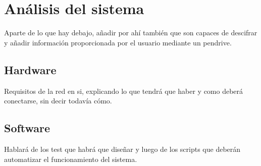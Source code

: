 \chapter{Análisis del sistema}
Aparte de lo que hay debajo, añadir por ahí también que son capaces de descifrar y añadir información proporcionada por el usuario mediante un pendrive.

\section{Hardware}
Requisitos de la red en si, explicando lo que tendrá que haber y como deberá conectarse, sin decir todavía cómo. 

\section{Software}
Hablará de los test que habrá que diseñar y luego de los scripts que deberán automatizar el funcionamiento del sistema.



%
%
%
%
%
%
%
%
%
%
%

